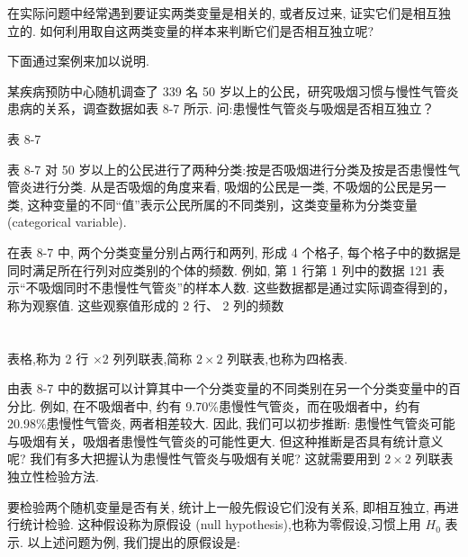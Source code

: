 \documentclass[10pt]{article}
\begin{document}
在实际问题中经常遇到要证实两类变量是相关的, 或者反过来, 证实它们是相互独立的. 如何利用取自这两类变量的样本来判断它们是否相互独立呢?

下面通过案例来加以说明.

某疾病预防中心随机调查了 339 名 50 岁以上的公民，研究吸烟习惯与慢性气管炎患病的关系，调查数据如表 8-7 所示. 问:患慢性气管炎与吸烟是否相互独立？

表 8-7

\begin{center}
\end{center}

表 8-7 对 50 岁以上的公民进行了两种分类:按是否吸烟进行分类及按是否患慢性气管炎进行分类. 从是否吸烟的角度来看, 吸烟的公民是一类, 不吸烟的公民是另一类, 这种变量的不同“值”表示公民所属的不同类别，这类变量称为分类变量 (categorical variable).

在表 8-7 中, 两个分类变量分别占两行和两列, 形成 4 个格子, 每个格子中的数据是同时满足所在行列对应类别的个体的频数. 例如, 第 1 行第 1 列中的数据 121 表示“不吸烟同时不患慢性气管炎”的样本人数. 这些数据都是通过实际调查得到的，称为观察值. 这些观察值形成的 2 行、 2 列的频数

\section*{}

表格,称为 2 行 \(\times  2\) 列列联表,简称 \(2 \times  2\) 列联表,也称为四格表.

由表 8-7 中的数据可以计算其中一个分类变量的不同类别在另一个分类变量中的百分比. 例如, 在不吸烟者中, 约有 9.70\%患慢性气管炎，而在吸烟者中，约有 20.98\%患慢性气管炎, 两者相差较大. 因此, 我们可以初步推断: 患慢性气管炎可能与吸烟有关，吸烟者患慢性气管炎的可能性更大. 但这种推断是否具有统计意义呢? 我们有多大把握认为患慢性气管炎与吸烟有关呢? 这就需要用到 \(2 \times  2\) 列联表独立性检验方法.

要检验两个随机变量是否有关, 统计上一般先假设它们没有关系, 即相互独立, 再进行统计检验. 这种假设称为原假设 (null hypothesis),也称为零假设,习惯上用 \({H}_{0}\) 表示. 以上述问题为例, 我们提出的原假设是:
\end{document}
